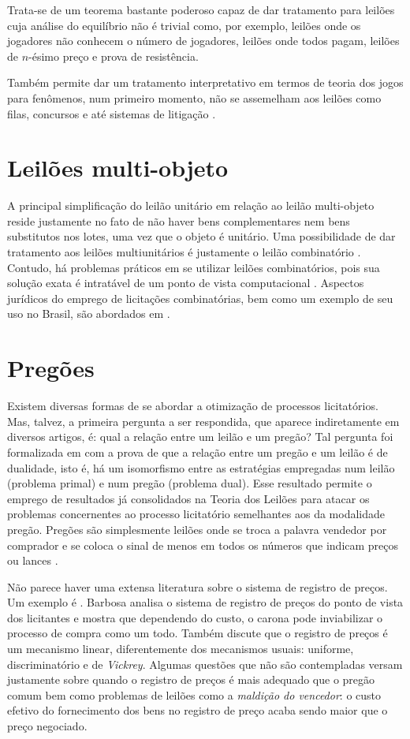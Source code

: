 Trata-se de um teorema bastante poderoso capaz de dar tratamento para leilões cuja análise do equilíbrio não é trivial como, por exemplo, leilões onde os jogadores não conhecem o número de jogadores, leilões onde todos pagam, leilões de $n$-ésimo preço e prova de resistência.

Também permite dar um tratamento interpretativo em termos de teoria dos jogos para fenômenos, num primeiro momento, não se assemelham aos leilões como filas, concursos e até sistemas de litigação \citet{Klemperer2004-qd}.

\section{Leilões multi-objeto}

A principal simplificação do leilão unitário em relação ao leilão multi-objeto reside justamente no fato de não haver bens complementares nem bens substitutos nos lotes, uma vez que o objeto é unitário. Uma possibilidade de dar tratamento aos leilões multiunitários é justamente o leilão combinatório \citet{Shoham2008}. Contudo, há problemas práticos em se utilizar leilões combinatórios, pois sua solução exata é intratável de um ponto de vista computacional \citet{Nisan2007}. Aspectos jurídicos do emprego de licitações combinatórias, bem como um exemplo de seu uso no Brasil, são abordados em \citet{pellegrini2018:MSc}.

\section{Pregões}

Existem diversas formas de se abordar a otimização de processos licitatórios. Mas, talvez, a primeira pergunta a ser respondida, que aparece indiretamente em diversos artigos, é: qual a relação entre um leilão e um pregão? Tal pergunta foi formalizada em \citet{deCastro2010} com a prova de que a relação entre um pregão e um leilão é de dualidade, isto é, há um isomorfismo entre as estratégias empregadas num leilão (problema primal) e num pregão (problema dual). Esse resultado permite o emprego de resultados já consolidados na Teoria dos Leilões para atacar os problemas concernentes ao processo licitatório semelhantes aos da modalidade pregão. Pregões são simplesmente leilões onde se troca a palavra vendedor por comprador e se coloca o sinal de menos em todos os números que indicam preços ou lances \citet{Shoham2008}.

Não parece haver uma extensa literatura sobre o sistema de registro de preços. Um exemplo é \citet{barbosa2013}. Barbosa analisa o sistema de registro de preços do ponto de vista dos licitantes e mostra que dependendo do custo, o carona pode inviabilizar o processo de compra como um todo. Também discute que o registro de preços é um mecanismo linear, diferentemente dos mecanismos usuais: uniforme, discriminatório e de \emph{Vickrey}. Algumas questões que não são contempladas versam justamente sobre quando o registro de preços é mais adequado que o pregão comum bem como problemas de leilões como a \emph{maldição do vencedor}: o custo efetivo do fornecimento dos bens no registro de preço acaba sendo maior que o preço negociado.

